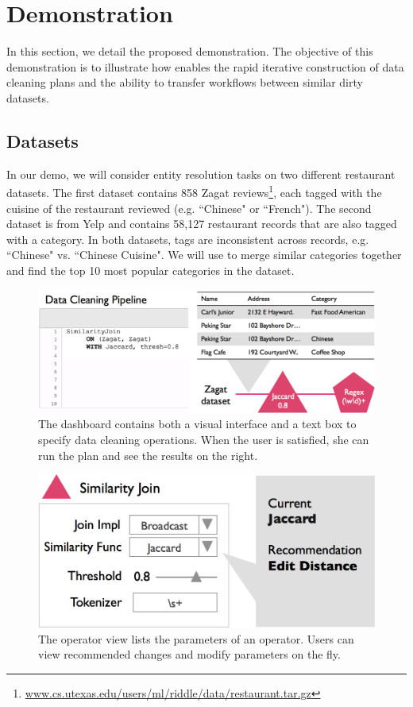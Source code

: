 \section{Demonstration}
In this section, we detail the proposed demonstration.
The objective of this demonstration is to illustrate 
how \sys enables the rapid iterative construction of data cleaning plans
and the ability to transfer workflows between similar dirty datasets.

\subsection{Datasets}
In our demo, we will consider entity resolution tasks on two different restaurant datasets.
The first dataset contains 858 Zagat reviews\footnote{\scriptsize{ \url{www.cs.utexas.edu/users/ml/riddle/data/restaurant.tar.gz}}},
each tagged with the cuisine of the restaurant reviewed (e.g. ``Chinese" or ``French").
The second dataset is from Yelp and contains 58,127 restaurant records that are also tagged with a category.
In both datasets, tags are inconsistent across records, e.g. ``Chinese" vs. ``Chinese Cuisine".
We will use \sys to merge similar categories together and find the top 10 most popular categories in the dataset.

\begin{figure}[t]
\centering
 \includegraphics[width=0.75\columnwidth]{figs/dashboard_screenshot.png}
 \caption{The dashboard contains both a visual interface and a text box to specify data cleaning operations. When the user is satisfied, she can run the plan and see the results on the right. \label{screenshot}}
\end{figure}


\begin{figure}[t]
\centering
 \includegraphics[width=0.65\columnwidth]{figs/dashboard_recsys.png}
 \caption{The operator view lists the parameters of an operator. Users can view recommended changes and modify parameters on the fly.}
 \label{screenshot-rec}\vspace{-1.75em}
\end{figure}

